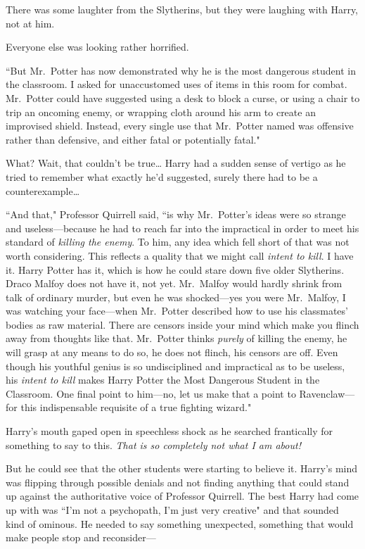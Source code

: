 There was some laughter from the Slytherins, but they were laughing with Harry, not at him.

Everyone else was looking rather horrified.

``But Mr.~Potter has now demonstrated why he is the most dangerous student in the classroom. I asked for unaccustomed uses of items in this room for combat. Mr.~Potter could have suggested using a desk to block a curse, or using a chair to trip an oncoming enemy, or wrapping cloth around his arm to create an improvised shield. Instead, every single use that Mr.~Potter named was offensive rather than defensive, and either fatal or potentially fatal."

What? Wait, that couldn't be true{\ldots} Harry had a sudden sense of vertigo as he tried to remember what exactly he'd suggested, surely there had to be a counterexample{\ldots}

``And that," Professor Quirrell said, ``is why Mr.~Potter's ideas were so strange and useless—because he had to reach far into the impractical in order to meet his standard of \emph{killing the enemy}. To him, any idea which fell short of that was not worth considering. This reflects a quality that we might call \emph{intent to kill}. I have it. Harry Potter has it, which is how he could stare down five older Slytherins. Draco Malfoy does not have it, not yet. Mr.~Malfoy would hardly shrink from talk of ordinary murder, but even he was shocked—yes you were Mr.~Malfoy, I was watching your face—when Mr.~Potter described how to use his classmates' bodies as raw material. There are censors inside your mind which make you flinch away from thoughts like that. Mr.~Potter thinks \emph{purely} of killing the enemy, he will grasp at any means to do so, he does not flinch, his censors are off. Even though his youthful genius is so undisciplined and impractical as to be useless, his \emph{intent to kill} makes Harry Potter the Most Dangerous Student in the Classroom. One final point to him—no, let us make that a point to Ravenclaw—for this indispensable requisite of a true fighting wizard."

Harry's mouth gaped open in speechless shock as he searched frantically for something to say to this. \emph{That is so completely not what I am about!}

But he could see that the other students were starting to believe it. Harry's mind was flipping through possible denials and not finding anything that could stand up against the authoritative voice of Professor Quirrell. The best Harry had come up with was ``I'm not a psychopath, I'm just very creative" and that sounded kind of ominous. He needed to say something unexpected, something that would make people stop and reconsider—

